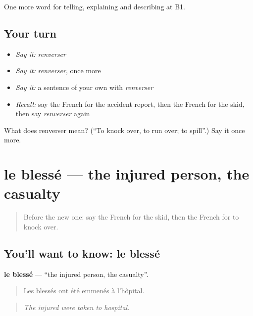 \begin{grammarlens}[title={What you've built}]
One more word for telling, explaining and describing at B1.
\end{grammarlens}

\subsection*{Your turn}
\begin{itemize}
\raggedright
  \item \emph{Say it:} \emph{renverser}
  \item \emph{Say it:} \emph{renverser}, once more
  \item \emph{Say it:} a sentence of your own with \emph{renverser}
  \item \emph{Recall:} say the French for the accident report, then the French for the skid, then say \emph{renverser} again
\end{itemize}

\begin{tcolorbox}[breakable,colback=teal!4,colframe=teal!35!black,title={Before you move on}]
What does renverser mean? (\textquotedblleft{}To knock over, to run over; to spill\textquotedblright{}.) Say it once more.
\end{tcolorbox}
\section[le blessé]{le blessé — the injured person, the casualty}

\label{lesson:FR-C298-blesse}



\begin{quote}
Before the new one: say the French for the skid, then the French for to knock over.
\end{quote}

\subsection*{You'll want to know: le blessé}
\textbf{le blessé} — \textquotedblleft{}the injured person, the casualty\textquotedblright{}.

\begin{quote}
Les blessés ont été emmenés à l'hôpital.
\end{quote}

\begin{quote}
\emph{The injured were taken to hospital.}
\end{quote}

